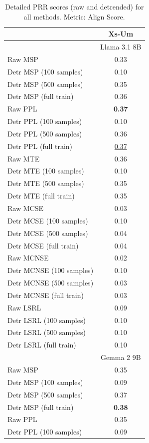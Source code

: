 \begin{table}
\footnotesize
\centering
\caption{Detailed PRR scores (raw and detrended) for all methods. Metric: Align Score.}
\begin{tabular}{lc}
\toprule
&Xs-Um\\
\midrule
& \multicolumn{8}{c}{Llama 3.1 8B}\\
\midrule
Raw MSP & 0.33 \\
Detr MSP (100 samples) & 0.10 \\
Detr MSP (500 samples) & 0.35 \\
Detr MSP (full train) & 0.36 \\
\midrule
Raw PPL & \textbf{0.37} \\
Detr PPL (100 samples) & 0.10 \\
Detr PPL (500 samples) & 0.36 \\
Detr PPL (full train) & \underline{0.37} \\
\midrule
Raw MTE & 0.36 \\
Detr MTE (100 samples) & 0.10 \\
Detr MTE (500 samples) & 0.35 \\
Detr MTE (full train) & 0.35 \\
\midrule
Raw MCSE & 0.03 \\
Detr MCSE (100 samples) & 0.10 \\
Detr MCSE (500 samples) & 0.04 \\
Detr MCSE (full train) & 0.04 \\
\midrule
Raw MCNSE & 0.02 \\
Detr MCNSE (100 samples) & 0.10 \\
Detr MCNSE (500 samples) & 0.03 \\
Detr MCNSE (full train) & 0.03 \\
\midrule
Raw LSRL & 0.09 \\
Detr LSRL (100 samples) & 0.10 \\
Detr LSRL (500 samples) & 0.10 \\
Detr LSRL (full train) & 0.10 \\
\midrule
\midrule
& \multicolumn{8}{c}{Gemma 2 9B}\\
\midrule
Raw MSP & 0.35 \\
Detr MSP (100 samples) & 0.09 \\
Detr MSP (500 samples) & 0.37 \\
Detr MSP (full train) & \textbf{0.38} \\
\midrule
Raw PPL & 0.35 \\
Detr PPL (100 samples) & 0.09 \\

\end{tabular}
\end{table}
